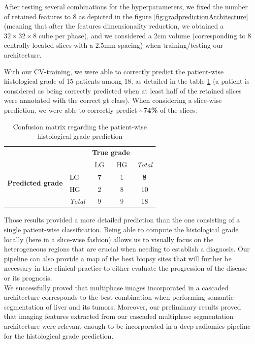 After testing several combinations for the hyperparameters, we
fixed the number of retained features to 8 as depicted in the
figure \ref{fig:gradpredictionArchitecture} (meaning that after the features dimensionality reduction,
we obtained a $ 32\times32\times8 $ cube per phase), and we considered a 2cm volume
(corresponding to 8 centrally located slices with a 2.5mm spacing) when
training/testing our architecture.

With our CV-training, we were able to correctly predict the patient-wise
histological grade of 15 patients among 18, as detailed in the table \ref{tab:confusion_matrix} (a patient is considered as being correctly predicted
when at least half of the retained slices were annotated with the
correct \ac{gt} class).
When considering a slice-wise prediction, we were able to correctly
predict \textbf{\textasciitilde{}74\%} of the slices.\\
\renewcommand{\arraystretch}{2}
\begin{table}[!htp]\centering
\caption{Confusion matrix regarding the patient-wise  histological grade prediction}\label{tab:confusion_matrix}
\begin{tabular}{l|l|c|c|c}
\multicolumn{2}{c}{}&\multicolumn{2}{c}{\textbf{True grade}}&\\
\cline{3-4}
\multicolumn{2}{c|}{}&LG&HG&\multicolumn{1}{c}{\textit{Total}}\\
\cline{2-4}
\multirow{2}{*}{\textbf{Predicted grade}}& LG & \textbf{7} & 1 & \textbf{8}\\
\cline{2-4}
& HG & 2 & 8 & 10 \\
\cline{2-4}
\multicolumn{1}{c}{} & \multicolumn{1}{c}{\textit{Total}} & \multicolumn{1}{c}{9} & \multicolumn{1}{c}{9} & \multicolumn{1}{c}{18}\\
\end{tabular}
\end{table}
\renewcommand{\arraystretch}{5}
Those results provided a more detailed prediction than the one
consisting of a single patient-wise classification. Being able to
compute the histological grade locally (here in a slice-wise fashion)
allows us to visually focus on the heterogeneous regions that are
crucial when needing to establish a diagnosis. Our pipeline can also
provide a map of the best biopsy sites that will further be necessary in
the clinical practice to either evaluate the progression of the disease
or its prognosis.\\
We successfully proved that multiphase images incorporated in a cascaded architecture corresponds to the best combination when performing semantic segmentation of liver and its tumors. Moreover, our preliminary results proved that imaging features extracted from our cascaded multiphase segmentation architecture were relevant enough to be incorporated in a deep radiomics pipeline for the histological grade prediction. 

